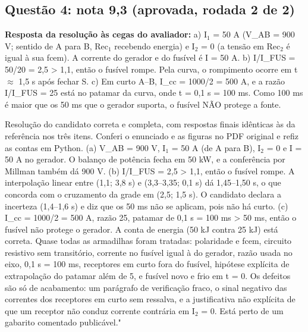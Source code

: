 \documentclass{article}%
\begin{document}
\subsection*{Questão 4: nota 9,3 (aprovada, rodada 2 de 2)}%
\textbf{Resposta da resolução às cegas do avaliador:} a) I$_{1}$ = 50 A (V\_AB = 900 V; sentido de A para B, Rec$_{1}$ recebendo energia) e I$_{2}$ = 0 (a tensão em Rec$_{2}$ é igual à sua fcem). A corrente do gerador e do fusível é I = 50 A.\newline%
\newline%
b) I/I\_FUS = 50/20 = 2,5 > 1,1, então o fusível rompe. Pela curva, o rompimento ocorre em t $\approx$ 1,5 s após fechar S.\newline%
\newline%
c) Em curto A--B, I\_cc = 1000/2 = 500 A, e a razão I/I\_FUS = 25 está no patamar da curva, onde t = 0,1 s = 100 ms. Como 100 ms é maior que os 50 ms que o gerador suporta, o fusível NÃO protege a fonte.\par %
Resolução do candidato correta e completa, com respostas finais idênticas às da referência nos três itens. Conferi o enunciado e as figuras no PDF original e refiz as contas em Python. (a) V\_AB = 900 V, I$_{1}$ = 50 A (de A para B), I$_{2}$ = 0 e I = 50 A no gerador. O balanço de potência fecha em 50 kW, e a conferência por Millman também dá 900 V. (b) I/I\_FUS = 2,5 > 1,1, então o fusível rompe. A interpolação linear entre (1,1; 3,8 s) e (3,3--3,35; 0,1 s) dá 1,45--1,50 s, o que concorda com o cruzamento da grade em (2,5; 1,5 s). O candidato declara a incerteza (1,4--1,6 s) e diz que os 50 ms não se aplicam, pois não há curto. (c) I\_cc = 1000/2 = 500 A, razão 25, patamar de 0,1 s = 100 ms > 50 ms, então o fusível não protege o gerador. A conta de energia (50 kJ contra 25 kJ) está correta. Quase todas as armadilhas foram tratadas: polaridade e fcem, circuito resistivo sem transitório, corrente no fusível igual à do gerador, razão usada no eixo, 0,1 s = 100 ms, receptores em curto fora do fusível, hipótese explícita de extrapolação do patamar além de 5, e fusível novo e frio em t = 0. Os defeitos são só de acabamento: um parágrafo de verificação fraco, o sinal negativo das correntes dos receptores em curto sem ressalva, e a justificativa não explícita de que um receptor não conduz corrente contrária em I$_{2}$ = 0. Está perto de um gabarito comentado publicável."%
\end{document}
